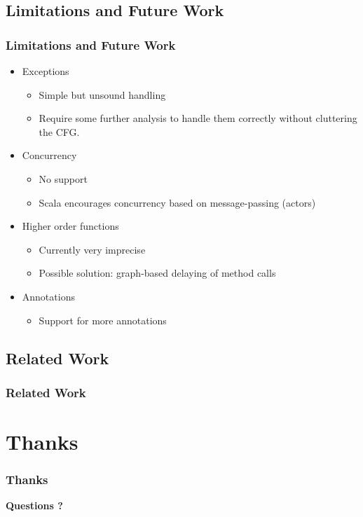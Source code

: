 \documentclass[hyperref={pdfpagelabels=false}]{beamer}
\begin{document}
\subsection{Limitations and Future Work}
\begin{frame}
\frametitle{Limitations and Future Work}
    \begin{itemize}
        \item Exceptions
        \begin{itemize}
            \item Simple but unsound handling
            \item Require some further analysis to handle them correctly without
cluttering the CFG.
        \end{itemize}
        \item Concurrency
        \begin{itemize}
            \item No support
            \item Scala encourages concurrency based on message-passing (actors)
        \end{itemize}
        \item Higher order functions
        \begin{itemize}
            \item Currently very imprecise
            \item Possible solution: graph-based delaying of method calls
        \end{itemize}
        \item Annotations
        \begin{itemize}
            \item Support for more annotations
        \end{itemize}
    \end{itemize}
\end{frame}

\subsection{Related Work}
\begin{frame}[allowframebreaks]
    \frametitle{Related Work}
    
    
\end{frame}


\section*{Thanks}
\begin{frame}
    \frametitle{Thanks}
    \begin{center}
        \textbf{Questions ?}
    \end{center}
\end{frame}
\appendix
{}
\setcounter{finalframe}{\value{framenumber}}
\end{document}

